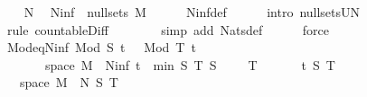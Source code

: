 \begin{isabellebody}
\ \ \isamarkupfalse%
\ N\ \isamarkupfalse%
\ {\isachardoublequoteopen}N{\isacharunderscore}{\kern0pt}inf\ {\isasymin}\ null{\isacharunderscore}{\kern0pt}sets\ {\isacharquery}{\kern0pt}M{\isachardoublequoteclose}\isanewline
\ \ \ \ \isamarkupfalse%
\ N{\isacharunderscore}{\kern0pt}inf{\isacharunderscore}{\kern0pt}def\isanewline
\ \ \ \ \isamarkupfalse%
\ {\isacharparenleft}{\kern0pt}intro\ null{\isacharunderscore}{\kern0pt}sets{\isacharunderscore}{\kern0pt}UN{\isacharprime}{\kern0pt}{\isacharparenright}{\kern0pt}\isanewline
\ \ \ \ \ \isamarkupfalse%
\ {\isacharparenleft}{\kern0pt}rule\ countable{\isacharunderscore}{\kern0pt}Diff{\isacharparenright}{\kern0pt}\isanewline
\ \ \ \ \ \ \isamarkupfalse%
\ {\isacharparenleft}{\kern0pt}simp\ add{\isacharcolon}{\kern0pt}\ Nats{\isacharunderscore}{\kern0pt}def{\isacharparenright}{\kern0pt}{\isacharplus}{\kern0pt}\isanewline
\ \ \ \ \isamarkupfalse%
\ force\isanewline
\ \ \isamarkupfalse%
\ Mod{\isacharunderscore}{\kern0pt}eq{\isacharunderscore}{\kern0pt}N{\isacharunderscore}{\kern0pt}inf{\isacharcolon}{\kern0pt}\ {\isachardoublequoteopen}{\isacharparenleft}{\kern0pt}Mod\ S{\isacharparenright}{\kern0pt}\ t\ {\isasymomega}\ {\isacharequal}{\kern0pt}\ {\isacharparenleft}{\kern0pt}Mod\ T{\isacharparenright}{\kern0pt}\ t\ {\isasymomega}{\isachardoublequoteclose}\isanewline
\ \ \ \ \ {\isachardoublequoteopen}{\isasymomega}\ {\isasymin}\ space\ {\isacharquery}{\kern0pt}M\ {\isacharminus}{\kern0pt}\ N{\isacharunderscore}{\kern0pt}inf{\isachardoublequoteclose}\ {\isachardoublequoteopen}t\ {\isasymin}\ {\isacharbraceleft}{\kern0pt}{}{\isachardot}{\kern0pt}{\isachardot}{\kern0pt}min\ S\ T{\isacharbraceright}{\kern0pt}{\isachardoublequoteclose}\ {\isachardoublequoteopen}S\ {\isasymin}\ {\isasymnat}\ {\isacharminus}{\kern0pt}\ {\isacharbraceleft}{\kern0pt}{}{\isacharbraceright}{\kern0pt}{\isachardoublequoteclose}\ {\isachardoublequoteopen}T\ {\isasymin}\ {\isasymnat}\ {\isacharminus}{\kern0pt}\ {\isacharbraceleft}{\kern0pt}{}{\isacharbraceright}{\kern0pt}{\isachardoublequoteclose}\ \ {\isasymomega}\ t\ S\ T\isanewline
\ \ \isamarkupfalse%
\ {\isacharminus}{\kern0pt}\isanewline
\ \ \ \ \isamarkupfalse%
\ {\isachardoublequoteopen}{\isasymomega}\ {\isasymin}\ space\ {\isacharquery}{\kern0pt}M\ {\isacharminus}{\kern0pt}\ N\ S\ T{\isachardoublequoteclose}\isanewline
\ \ \ \ \ \ \isamarkupfalse%

\end{isabellebody}

